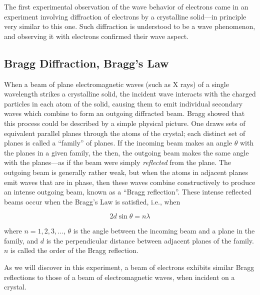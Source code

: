 \documentclass{article}
\begin{document}
The first experimental observation of the wave behavior of electrons
came in an experiment involving diffraction of electrons by a
crystalline solid---in principle very similar to this one. Such
diffraction is understood to be a wave phenomenon, and observing it
with electrons confirmed their wave aspect.

\subsection{Bragg Diffraction, Bragg's Law}

When a beam of plane electromagnetic waves (such as X rays) of a single
wavelength strikes a crystalline solid, the incident wave interacts
with the charged particles in each atom of the solid, causing them to
emit individual secondary waves which combine to form an outgoing
diffracted beam.  Bragg showed that this process could be described by
a simple physical picture.  One draws sets of equivalent parallel
planes through the atoms of the crystal; each distinct set of planes is
called a ``family'' of planes.  If
the incoming beam makes an angle $\theta$ with the planes in a given
family, the then, the outgoing beam makes the same angle with the
planes---as if the beam were simply {\em reflected} from the plane.
 The outgoing beam is generally rather weak, but when the atoms in
adjacent planes emit waves that are in phase, then these waves combine
constructively to produce an intense outgoing beam, known as a
``Bragg reflection''.  These intense
reflected beams occur when the Bragg's Law is
satisfied, i.e., when 

\begin{equation}
2 d \sin\theta = n\lambda
\label{eq:bragglaw}
\end{equation}

where $n = 1,2,3,\ldots$, $\theta$ is the angle between the incoming beam and a plane in the
family, and $d$ is the perpendicular distance between adjacent planes of
the family.  $n$ is called the order of the Bragg reflection.

As we will discover in this experiment, a beam of electrons exhibits
similar Bragg reflections to those of a beam of electromagnetic waves,
when incident on a crystal.
\end{document}
